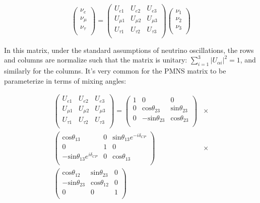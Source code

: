 \begin{equation}
  \left(
  \begin{array}{c}
    \nu_e \\
    \nu_\mu \\
    \nu_\tau \\
  \end{array}
  \right)
  =
  \left(
  \begin{array}{ccc}
    U_{e1} & U_{e2} & U_{e3}  \\
    U_{\mu1} & U_{\mu2} & U_{\mu3}  \\
    U_{\tau1} & U_{\tau2} & U_{\tau3}  \\
  \end{array} 
  \right)
  \left(
  \begin{array}{c}
    \nu_1 \\
    \nu_2 \\
    \nu_3 \\
  \end{array}
  \right)
\end{equation}

In this matrix, under the standard assumptions of neutrino oscillations, the rows and columns are normalize such that the matrix is  unitary: $\sum_{i=1}^3 | U_{\alpha i} | ^2 = 1$, and similarly for the columns.  It's very common for the PMNS matrix to be parameterize in terms of mixing angles: 

\begin{align}
  \left(
  \begin{array}{ccc}
    U_{e1} & U_{e2} & U_{e3}  \\
    U_{\mu1} & U_{\mu2} & U_{\mu3}  \\
    U_{\tau1} & U_{\tau2} & U_{\tau3}  \\
  \end{array} 
  \right)
  = 
  \left(
  \begin{array}{ccc}
    1 & 0 & 0  \\
    0 & \text{cos}\theta_{23} & \text{sin}\theta_{23}  \\
    0 & -\text{sin}\theta_{23} & \text{cos}\theta_{23}  \\
  \end{array} 
  \right)
  &\times \\
  \left(
  \begin{array}{ccc}
     \text{cos}\theta_{13} & 0 & \text{sin}\theta_{13} e^{ - i \delta_{CP}}  \\
     0 & 1 & 0  \\
     -\text{sin}\theta_{13} e^{i \delta_{CP}} & 0 & \text{cos}\theta_{13}  \\
  \end{array} 
  \right)
  &\times \\
  \left(
  \begin{array}{ccc}
    \text{cos}\theta_{12} & \text{sin}\theta_{23} & 0  \\
    - \text{sin}\theta_{23} & \text{cos}\theta_{12} & 0 \\
    0 & 0 & 1  \\
  \end{array} 
  \right)
\end{align}

